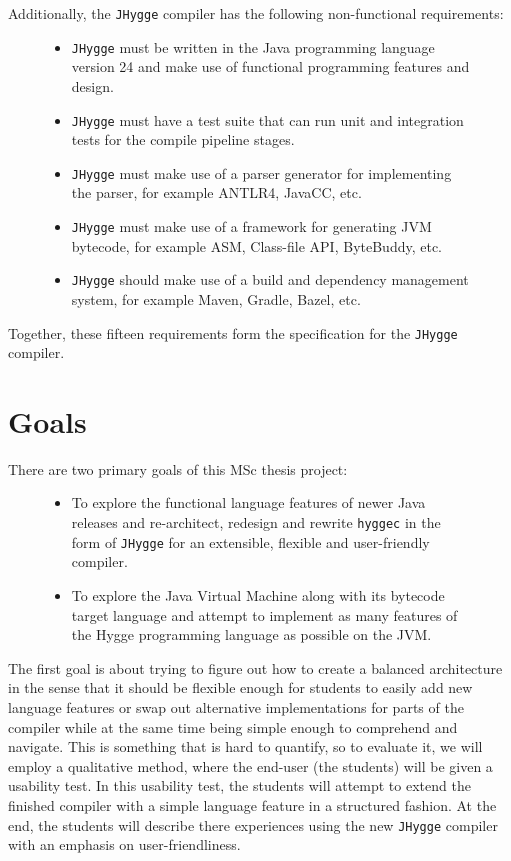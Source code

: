 Additionally, the \texttt{JHygge} compiler has the following non-functional requirements:

\begin{figure}
\centering  
\begin{itemize}
  \item \texttt{JHygge} must be written in the Java programming language version 24 and make use of functional programming features and design.
  \item \texttt{JHygge} must have a test suite that can run unit and integration tests for the compile pipeline stages.
  \item \texttt{JHygge} must make use of a parser generator for implementing the parser, for example ANTLR4, JavaCC, etc.
  \item \texttt{JHygge} must make use of a framework for generating JVM bytecode, for example ASM, Class-file API, ByteBuddy, etc.
  \item \texttt{JHygge} should make use of a build and dependency management system, for example Maven, Gradle, Bazel, etc.
\end{itemize}
\caption{}
\label{}
\end{figure}

Together, these fifteen requirements form the specification for the \texttt{JHygge} compiler.

\section{Goals}

There are two primary goals of this MSc thesis project:

\begin{figure}[H]
\centering 
\begin{itemize}
  \item To explore the functional language features of newer Java releases and re-architect, redesign and rewrite \texttt{hyggec} in the form of \texttt{JHygge} for an extensible, flexible and user-friendly compiler.
  \item To explore the Java Virtual Machine along with its bytecode target language and attempt to implement as many features of the Hygge programming language as possible on the JVM.
\end{itemize}
\caption{}
\label{}
\end{figure}

The first goal is about trying to figure out how to create a balanced architecture in the sense that it should be flexible enough for students to easily add new language features or swap out alternative
implementations for parts of the compiler while at the same time being simple enough to comprehend and navigate. This is something that is hard to quantify, so to evaluate it, we will
employ a qualitative method, where the end-user (the students) will be given a usability test. In this usability test, the students will attempt to extend the finished compiler with
a simple language feature in a structured fashion. At the end, the students will describe there experiences using the new \texttt{JHygge} compiler with an emphasis on user-friendliness.

